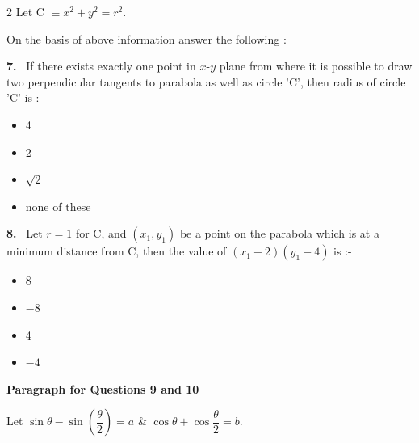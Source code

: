 \documentclass[10pt]{extarticle}
\newcommand{\qn}[1]{\par\smallskip\noindent\textbf{#1.}~}
\newcommand{\paraq}[2]{\par\smallskip\noindent\textbf{Paragraph for Questions #1 and #2}\par}
\newenvironment{qoptions}{\begin{itemize}[leftmargin=1.8em,itemsep=1pt,topsep=2pt,label={}]}{\end{itemize}}
\newcommand{\opt}[2]{\item[(#1)] #2}
\begin{document}
\begin{multicols}{2}
Let C $\equiv x^2+y^2=r^2$.

On the basis of above information answer the following :
\qn{7} If there exists exactly one point in $x$-$y$ plane from where it is possible to draw two perpendicular tangents to parabola as well as circle 'C', then radius of circle 'C' is :-
\begin{qoptions}
\opt{A}{4}
\opt{B}{2}
\opt{C}{$\sqrt2$}
\opt{D}{none of these}
\end{qoptions}
\qn{8} Let $r=1$ for C, and $(x_1,y_1)$ be a point on the parabola which is at a minimum distance from C, then the value of $(x_1+2)(y_1-4)$ is :-
\begin{qoptions}
\opt{A}{8}
\opt{B}{$-8$}
\opt{C}{4}
\opt{D}{$-4$}
\end{qoptions}
\paraq{9}{10}
Let $\sin\theta-\sin\left(\dfrac\theta2\right)=a$ \& $\cos\theta+\cos\dfrac\theta2=b$.


\end{multicols}
\end{document}
